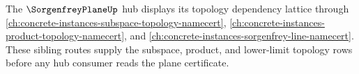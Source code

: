 The $\SorgenfreyPlaneUp$ hub displays its topology dependency lattice through \autoref{ch:concrete-instances-subspace-topology-namecert}, \autoref{ch:concrete-instances-product-topology-namecert}, and \autoref{ch:concrete-instances-sorgenfrey-line-namecert}. These sibling routes supply the subspace, product, and lower-limit topology rows before any hub consumer reads the plane certificate.

